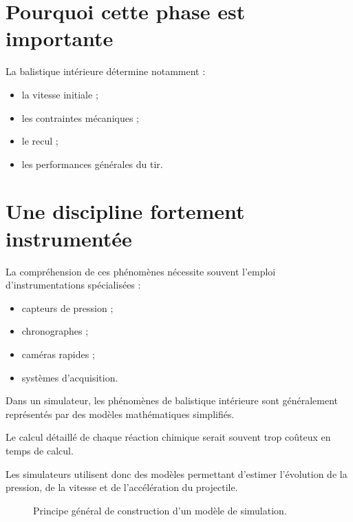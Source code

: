 \section{Pourquoi cette phase est importante}

La balistique intérieure détermine notamment :

\begin{itemize}
    \item la vitesse initiale ;
    \item les contraintes mécaniques ;
    \item le recul ;
    \item les performances générales du tir.
\end{itemize}

\section{Une discipline fortement instrumentée}

La compréhension de ces phénomènes nécessite souvent l'emploi
d'instrumentations spécialisées :

\begin{itemize}
    \item capteurs de pression ;
    \item chronographes ;
    \item caméras rapides ;
    \item systèmes d'acquisition.
\end{itemize}

\begin{simulation}

Dans un simulateur, les phénomènes de balistique intérieure sont généralement
représentés par des modèles mathématiques simplifiés.

Le calcul détaillé de chaque réaction chimique serait souvent trop coûteux en
temps de calcul.

Les simulateurs utilisent donc des modèles permettant d'estimer l'évolution de
la pression, de la vitesse et de l'accélération du projectile.

\end{simulation}

\begin{figure}[htbp]
\centering


\caption{Principe général de construction d'un modèle de simulation.}
\label{fig:essais_modele_simulation}

\end{figure}

